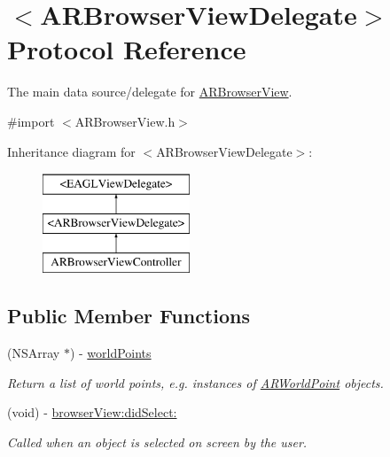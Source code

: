 \hypertarget{protocol_a_r_browser_view_delegate-p}{
\section{$<$\-A\-R\-Browser\-View\-Delegate$>$ \-Protocol \-Reference}
\label{protocol_a_r_browser_view_delegate-p}
}


\-The main data source/delegate for \hyperlink{interface_a_r_browser_view}{\-A\-R\-Browser\-View}.  




{\ttfamily \#import $<$\-A\-R\-Browser\-View.\-h$>$}

\-Inheritance diagram for $<$\-A\-R\-Browser\-View\-Delegate$>$\-:\begin{figure}[H]
\begin{center}
\leavevmode
\includegraphics[height=3.000000cm]{protocol_a_r_browser_view_delegate-p}
\end{center}
\end{figure}
\subsection*{\-Public \-Member \-Functions}
\begin{DoxyCompactItemize}
\item 
\hypertarget{protocol_a_r_browser_view_delegate-p_a52ee75fc0a19b24f804419fc3ab6df43}{
(\-N\-S\-Array $\ast$) -\/ \hyperlink{protocol_a_r_browser_view_delegate-p_a52ee75fc0a19b24f804419fc3ab6df43}{world\-Points}}
\label{protocol_a_r_browser_view_delegate-p_a52ee75fc0a19b24f804419fc3ab6df43}

\begin{DoxyCompactList}\small\item\em \-Return a list of world points, e.\-g. instances of \hyperlink{interface_a_r_world_point}{\-A\-R\-World\-Point} objects. \end{DoxyCompactList}\item 
\hypertarget{protocol_a_r_browser_view_delegate-p_a1cde6bfffaa5d319ce04954867fe909f}{
(void) -\/ \hyperlink{protocol_a_r_browser_view_delegate-p_a1cde6bfffaa5d319ce04954867fe909f}{browser\-View\-:did\-Select\-:}}
\label{protocol_a_r_browser_view_delegate-p_a1cde6bfffaa5d319ce04954867fe909f}

\begin{DoxyCompactList}\small\item\em \-Called when an object is selected on screen by the user. \end{DoxyCompactList}\end{DoxyCompactItemize}


